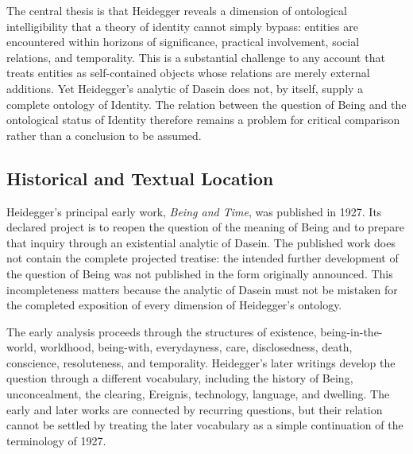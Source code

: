 \label{para:VS.B01.P01.C08.S11.SS01.P004}

The central thesis is that Heidegger reveals a dimension
of ontological intelligibility that a theory of identity
cannot simply bypass: entities are encountered within
horizons of significance, practical involvement, social
relations, and temporality. This is a substantial challenge
to any account that treats entities as self-contained
objects whose relations are merely external additions.
Yet Heidegger's analytic of Dasein does not, by itself,
supply a complete ontology of Identity. The relation
between the question of Being and the ontological status
of Identity therefore remains a problem for critical
comparison rather than a conclusion to be assumed.



\subsection{Historical and Textual Location}
\label{subsec:ch08-heidegger-historical}

\label{para:VS.B01.P01.C08.S11.SS02.P001}

Heidegger's principal early work, \textit{Being and Time},
was published in 1927. Its declared project is to reopen
the question of the meaning of Being and to prepare that
inquiry through an existential analytic of Dasein. The
published work does not contain the complete projected
treatise: the intended further development of the question
of Being was not published in the form originally announced.
This incompleteness matters because the analytic of Dasein
must not be mistaken for the completed exposition of every
dimension of Heidegger's ontology.
\cite[Introduction and §§1--8]{HeideggerBeingTime}

\label{para:VS.B01.P01.C08.S11.SS02.P002}

The early analysis proceeds through the structures of
existence, being-in-the-world, worldhood, being-with,
everydayness, care, disclosedness, death, conscience,
resoluteness, and temporality. Heidegger's later writings
develop the question through a different vocabulary,
including the history of Being, unconcealment, the
clearing, Ereignis, technology, language, and dwelling.
The early and later works are connected by recurring
questions, but their relation cannot be settled by
treating the later vocabulary as a simple continuation
of the terminology of 1927.

